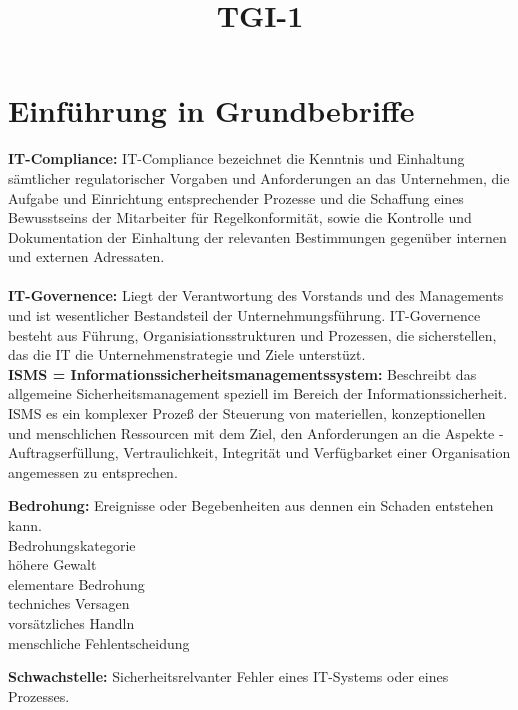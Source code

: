 \documentclass[a4paper,10pt]{scrartcl}
\title{TGI-1}
\author{}
\begin{document}
\section{Einführung in Grundbebriffe}

\textbf{IT-Compliance: }  IT-Compliance bezeichnet die Kenntnis und
Einhaltung sämtlicher regulatorischer
Vorgaben und Anforderungen an das
Unternehmen, die Aufgabe und Einrichtung
entsprechender Prozesse und die Schaffung
eines Bewusstseins der Mitarbeiter für
Regelkonformität, sowie die Kontrolle und
Dokumentation der Einhaltung der
relevanten Bestimmungen gegenüber
internen und externen Adressaten.
\\
\\
\textbf{IT-Governence: } Liegt der Verantwortung des Vorstands und des Managements und ist wesentlicher Bestandsteil der 
Unternehmungsführung. IT-Governence besteht aus Führung, Organisiationsstrukturen und Prozessen, die sicherstellen,
das die IT die Unternehmenstrategie und Ziele unterstüzt.
\\
\textbf{ISMS = Informationssicherheitsmanagementssystem: } Beschreibt das allgemeine Sicherheitsmanagement speziell im Bereich der
Informationssicherheit. ISMS es ein komplexer Prozeß der Steuerung von materiellen, konzeptionellen und menschlichen Ressourcen mit
dem Ziel, den Anforderungen an die Aspekte -Auftragserfüllung, Vertraulichkeit, Integrität und Verfügbarket einer Organisation
angemessen zu entsprechen.

\textbf{Bedrohung:}
Ereignisse oder Begebenheiten aus dennen ein Schaden entstehen kann.\\

Bedrohungskategorie\\
höhere Gewalt\\
elementare Bedrohung\\
techniches Versagen\\
vorsätzliches Handln\\
menschliche Fehlentscheidung

\textbf {Schwachstelle:} Sicherheitsrelvanter Fehler eines IT-Systems oder eines Prozesses.
\end{document}
